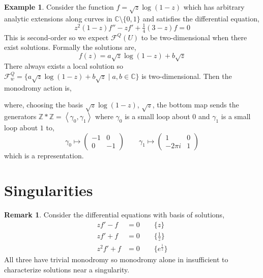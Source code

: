 \documentclass[12pt]{extarticle}
\newcommand{\Z}{\mathbb{Z}}
\newcommand{\C}{\mathbb{C}}
\theoremstyle{definition}
\newtheorem{example}[theorem]{Example}
\newtheorem{remark}{Remark}
\newcommand{\F}{\mathcal{F}}
\newcommand{\GL}[2]{\mathrm{GL}_{#1}\left( #2 \right)}
\begin{document}
\begin{example}
Consider the function $f = \sqrt{z} \log{(1 - z)}$
which has arbitrary analytic extensions along curves in $\C \setminus \{ 0, 1 \}$ and satisfies the differential equation,
\[ z^2(1 - z) f'' - z f' + \tfrac{1}{4}(3-z) f = 0  \]
This is second-order so we expect $\F^Q(U)$ to be two-dimensional when there exist solutions. Formally the solutions are,
\[ f(z) = a \sqrt{z} \log{(1 - z)} + b \sqrt{z} \]
There always exists a local solution so $\F^Q_w = \{ a \sqrt{z} \log{(1 - z)} + b \sqrt{z} \mid a,b \in \C \}$ is two-dimensional. Then the monodromy action is,
\begin{center}
\end{center}
where, choosing the basis $\sqrt{z} \log{(1 - z)}$, $\sqrt{z}$, the bottom map sends the generators $\Z * \Z = \left< \gamma_0, \gamma_1 \right>$ where $\gamma_0$ is a small loop about $0$ and $\gamma_1$ is a small loop about $1$ to,
\[ \gamma_0 \mapsto 
\begin{pmatrix}
-1 & 0
\\
0 & -1 
\end{pmatrix}  \quad \quad \gamma_1 \mapsto 
\begin{pmatrix}
1 & 0
\\
- 2 \pi i & 1 
\end{pmatrix} \]
which is a representation.
\end{example}

\section{Singularities}

\begin{remark}
Consider the differential equations with basis of solutions,
\begin{align*}
z f' - f & = 0 \quad \quad \{ z \} 
\\
z f' + f & = 0 \quad \quad \{ \frac{1}{z} \}
\\
z^2 f' + f & = 0 \quad \quad \{ e^{\frac{1}{z}} \}  
\end{align*}
All three have trivial monodromy so monodromy alone in insufficient to characterize solutions near a singularity.
\end{remark}
\end{document}
